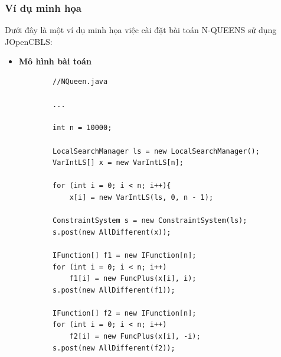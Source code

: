 \subsubsection{Ví dụ minh họa}
Dưới đây là một ví dụ minh họa việc cài đặt bài toán N-QUEENS sử dụng JOpenCBLS:
\begin{itemize}
	\item \textbf{Mô hình bài toán}
	\begin{lstlisting}
		//NQueen.java

		...		
		
		int n = 10000;
		
		LocalSearchManager ls = new LocalSearchManager();
		VarIntLS[] x = new VarIntLS[n];
		
		for (int i = 0; i < n; i++){
			x[i] = new VarIntLS(ls, 0, n - 1);
			
		ConstraintSystem s = new ConstraintSystem(ls);
		s.post(new AllDifferent(x));
		
		IFunction[] f1 = new IFunction[n];
		for (int i = 0; i < n; i++)
			f1[i] = new FuncPlus(x[i], i);
		s.post(new AllDifferent(f1));
		
		IFunction[] f2 = new IFunction[n];
		for (int i = 0; i < n; i++)
			f2[i] = new FuncPlus(x[i], -i);
		s.post(new AllDifferent(f2));
		

\end{lstlisting}
\end{itemize}

